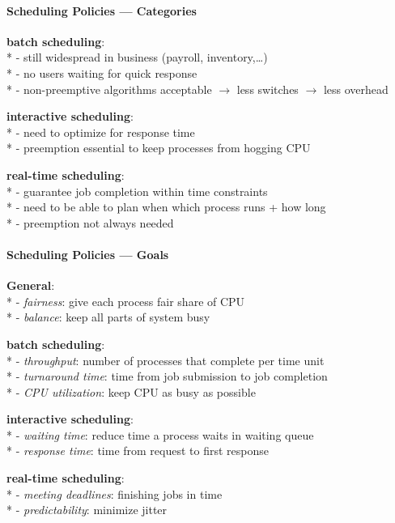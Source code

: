 \paragraph{Scheduling Policies --- Categories}
\begin{items}
  \item \textbf{batch scheduling}: \\*
    - still widespread in business (payroll, inventory,\dots) \\*
    - no users waiting for quick response \\*
    - non-preemptive algorithms acceptable \( \to \) less switches \( \to \) less overhead
  \item \textbf{interactive scheduling}: \\*
    - need to optimize for response time \\*
    - preemption essential to keep processes from hogging CPU
  \item \textbf{real-time scheduling}: \\*
    - guarantee job completion within time constraints \\*
    - need to be able to plan when which process runs + how long \\*
    - preemption not always needed
\end{items}

\paragraph{Scheduling Policies --- Goals}
\begin{items}
  \item \textbf{General}: \\*
    - \emph{fairness}: give each process fair share of CPU \\*
    - \emph{balance}: keep all parts of system busy
  \item \textbf{batch scheduling}: \\*
    - \emph{throughput}: number of processes that complete per time unit \\*
    - \emph{turnaround time}: time from job submission to job completion \\*
    - \emph{CPU utilization}: keep CPU as busy as possible
  \item \textbf{interactive scheduling}: \\*
    - \emph{waiting time}: reduce time a process waits in waiting queue \\*
    - \emph{response time}: time from request to first response
  \item \textbf{real-time scheduling}: \\*
    - \emph{meeting deadlines}: finishing jobs in time \\*
    - \emph{predictability}: minimize jitter
\end{items}

